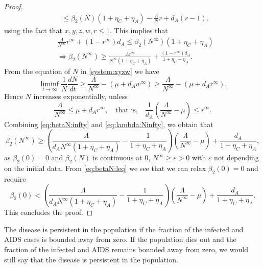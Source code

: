 \documentclass{my_aims}
\theoremstyle{definition}
\begin{document}
\begin{proof}
\begin{equation*}
\begin{split}
&\leq \beta_2(N)(1 + \eta_C + \eta_A) - \frac{\Lambda}{N} r + d_A (r-1),
\end{split}
\end{equation*}
using the fact that $x, y, z, w, r \leq 1$. This implies that
\begin{equation}
\label{eq:betaN:infty}
\begin{split}
&\frac{\Lambda}{N^\infty} r^\infty + (1-r^\infty)d_A
\leq \beta_2(N^\infty)(1 + \eta_C + \eta_A)\\
&  \Rightarrow \beta_2(N^\infty) \geq \frac{\Lambda r^\infty}{N^\infty
\left(1 + \eta_C + \eta_A\right)}
+ \frac{(1-r^\infty)d_A}{1 + \eta_C + \eta_A}.
\end{split}
\end{equation}
From the equation of $N$ in \eqref{system:xyzw} we have
\begin{equation*}
\liminf_{t \to \infty} \frac{1}{N} \frac{dN}{dt} \geq \frac{\Lambda}{N^\infty}
- \left(\mu + d_A w^\infty \right) \geq \frac{\Lambda}{N^\infty}
- \left(\mu + d_A r^\infty \right).
\end{equation*}
Hence $N$ increases exponentially, unless
\begin{equation}
\label{eq:lambda:Ninfty}
\frac{\Lambda}{N^\infty} \leq \mu + d_A r^\infty,
\quad \text{that is,} \quad
\frac{1}{d_A} \left( \frac{\Lambda}{N^\infty} - \mu \right) \leq r^\infty.
\end{equation}
Combining \eqref{eq:betaN:infty} and \eqref{eq:lambda:Ninfty}, we obtain that
\begin{equation}
\label{eq:betaN:leq}
\beta_2(N^\infty) \geq \left(\frac{\Lambda}{d_A N^\infty (1 + \eta_C + \eta_A)}
- \frac{1}{1+\eta_C + \eta_A} \right) \left(\frac{\Lambda}{N^\infty} - \mu \right)
+ \frac{d_A}{1+\eta_C + \eta_A},
\end{equation}
as $\beta_2(0) = 0$ and $\beta_2(N)$ is continuous at $0$, $N^\infty \geq \varepsilon > 0$
with $\varepsilon$ not depending on the initial data. From \eqref{eq:betaN:leq}
we see that we can relax $\beta_2(0) = 0$ and require
\begin{equation*}
\beta_2(0) < \left(\frac{\Lambda}{d_A N^\infty (1 + \eta_C + \eta_A)}
- \frac{1}{1+\eta_C + \eta_A} \right) \left(\frac{\Lambda}{N^\infty}
- \mu \right) + \frac{d_A}{1+\eta_C + \eta_A}.
\end{equation*}
This concludes the proof.
\end{proof}

The disease is persistent in the population if the fraction of the infected
and AIDS cases is bounded away from zero. If the population dies out and the
fraction of the infected and AIDS remains bounded away from zero, we would
still say that the disease is persistent in the population.
\end{document}
